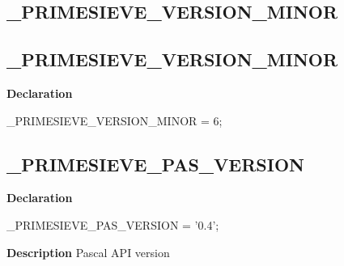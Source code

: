 \documentclass{report}
\newif\ifpdf
\begin{document}
\subsection*{\large{\textbf{{\_}PRIMESIEVE{\_}VERSION{\_}MINOR}}\normalsize\hspace{1ex}\hrulefill}
\else
\subsection*{{\_}PRIMESIEVE{\_}VERSION{\_}MINOR}
\fi
\label{primesieve-_PRIMESIEVE_VERSION_MINOR}
\begin{list}{}{
\setlength{\itemindent}{0cm}
\setlength{\listparindent}{0cm}
\setlength{\leftmargin}{\evensidemargin}
\addtolength{\leftmargin}{\tmplength}
\settowidth{\labelsep}{X}
\addtolength{\leftmargin}{\labelsep}
\setlength{\labelwidth}{\tmplength}
}
\item[\textbf{Declaration}\hfill]
\ifpdf
\begin{flushleft}
\fi
\begin{ttfamily}
{\_}PRIMESIEVE{\_}VERSION{\_}MINOR = 6;\end{ttfamily}

\ifpdf
\end{flushleft}
\fi

\end{list}
\ifpdf
\subsection*{\large{\textbf{{\_}PRIMESIEVE{\_}PAS{\_}VERSION}}\normalsize\hspace{1ex}\hrulefill}
\else
\subsection*{{\_}PRIMESIEVE{\_}PAS{\_}VERSION}
\fi
\label{primesieve-_PRIMESIEVE_PAS_VERSION}
\begin{list}{}{
\setlength{\itemindent}{0cm}
\setlength{\listparindent}{0cm}
\setlength{\leftmargin}{\evensidemargin}
\addtolength{\leftmargin}{\tmplength}
\settowidth{\labelsep}{X}
\addtolength{\leftmargin}{\labelsep}
\setlength{\labelwidth}{\tmplength}
}
\item[\textbf{Declaration}\hfill]
\ifpdf
\begin{flushleft}
\fi
\begin{ttfamily}
{\_}PRIMESIEVE{\_}PAS{\_}VERSION = '0.4';\end{ttfamily}

\ifpdf
\end{flushleft}
\fi

\par
\item[\textbf{Description}]
Pascal API version

\end{list}
\ifpdf
\end{document}

